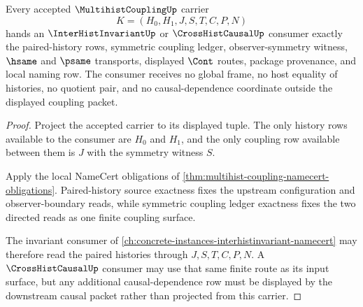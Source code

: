 \begin{theorem}
\label{thm:multihist-coupling-invariant-handoff}
Every accepted $\MultihistCouplingUp$ carrier
$$
K=(H_0,H_1,J,S,T,C,P,N)
$$
hands an $\InterHistInvariantUp$ or $\CrossHistCausalUp$ consumer exactly the paired-history rows, symmetric coupling ledger, observer-symmetry witness, $\hsame$ and $\psame$ transports, displayed $\Cont$ routes, package provenance, and local naming row. The consumer receives no global frame, no host equality of histories, no quotient pair, and no causal-dependence coordinate outside the displayed coupling packet.
\end{theorem}
\begin{proof}
Project the accepted carrier to its displayed tuple. The only history rows available to the consumer are $H_0$ and $H_1$, and the only coupling row available between them is $J$ with the symmetry witness $S$.

Apply the local NameCert obligations of \autoref{thm:multihist-coupling-namecert-obligations}. Paired-history source exactness fixes the upstream configuration and observer-boundary reads, while symmetric coupling ledger exactness fixes the two directed reads as one finite coupling surface.

The invariant consumer of \autoref{ch:concrete-instances-interhistinvariant-namecert} may therefore read the paired histories through $J,S,T,C,P,N$. A $\CrossHistCausalUp$ consumer may use that same finite route as its input surface, but any additional causal-dependence row must be displayed by the downstream causal packet rather than projected from this carrier.
\end{proof}

